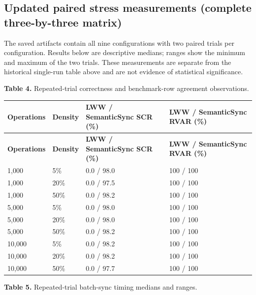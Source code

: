 \documentclass[runningheads]{llncs}
\begin{document}
\subsection{Updated paired stress measurements (complete three-by-three matrix)}
The saved \texttt{} artifacts contain all nine configurations with two paired trials per configuration. Results below are descriptive medians; ranges show the minimum and maximum of the two trials. These measurements are separate from the historical single-run table above and are not evidence of statistical significance.

\textbf{Table 4.} Repeated-trial correctness and benchmark-row agreement observations.

\begin{longtable}{p{}p{}p{}p{}}
\textbf{Operations} & \textbf{Density} & \textbf{LWW / SemanticSync SCR (\%)} & \textbf{LWW / SemanticSync RVAR (\%)} \\\hline
\endfirsthead\hline \textbf{Operations} & \textbf{Density} & \textbf{LWW / SemanticSync SCR (\%)} & \textbf{LWW / SemanticSync RVAR (\%)} \\\hline\endhead
1,000 & 5\% & 0.0 / 98.0 & 100 / 100 \\
1,000 & 20\% & 0.0 / 97.5 & 100 / 100 \\
1,000 & 50\% & 0.0 / 98.2 & 100 / 100 \\
5,000 & 5\% & 0.0 / 98.0 & 100 / 100 \\
5,000 & 20\% & 0.0 / 98.0 & 100 / 100 \\
5,000 & 50\% & 0.0 / 98.2 & 100 / 100 \\
10,000 & 5\% & 0.0 / 98.2 & 100 / 100 \\
10,000 & 20\% & 0.0 / 98.2 & 100 / 100 \\
10,000 & 50\% & 0.0 / 97.7 & 100 / 100 \\
\end{longtable}
\textbf{Table 5.} Repeated-trial batch-sync timing medians and ranges.
\end{document}
